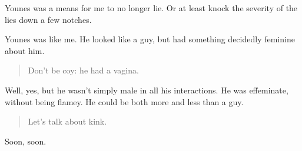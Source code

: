 Younes was a means for me to no longer lie. Or at least knock the severity of the lies down a few notches.

Younes was like me. He looked like a guy, but had something decidedly feminine about him.

\begin{quote}
Don't be coy: he had a vagina.
\end{quote}

Well, yes, but he wasn't simply male in all his interactions. He was effeminate, without being flamey. He could be both more and less than a guy.

\begin{quote}
Let's talk about kink.
\end{quote}

Soon, soon.
